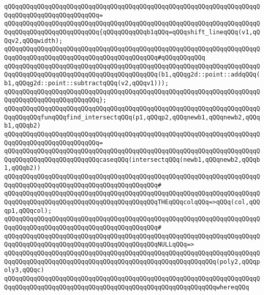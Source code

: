\verb|qQQqqQQqqQQqqQQqqQQqqQQqqQQqqQQqqQQqqQQqqQQqqQQqqQQqqQQqqQQqqQQqqQQqqQQqqQQqqQQqqQQqqQQqqQQqqQQq=|\newline
\verb|qQQqqQQqqQQqqQQqqQQqqQQqqQQqqQQqqQQqqQQqqQQqqQQqqQQqqQQqqQQqqQQqqQQqqQQqqQQqqQQqqQQqqQQqqQQqqQQq{qQQqqQQqqQQqb1qQQq=qQQqshift_lineqQQq(v1,qQQqv2,qQQqwidth);|\newline
\verb|qQQqqQQqqQQqqQQqqQQqqQQqqQQqqQQqqQQqqQQqqQQqqQQqqQQqqQQqqQQqqQQqqQQqqQQqqQQqqQQqqQQqqQQqqQQqqQQqqQQqqQQqqQQqqQQq#qQQqqQQqqQQq|\newline
\verb|qQQqqQQqqQQqqQQqqQQqqQQqqQQqqQQqqQQqqQQqqQQqqQQqqQQqqQQqqQQqqQQqqQQqqQQqqQQqqQQqqQQqqQQqqQQqqQQqqQQqqQQqqQQqqQQq(b1,qQQqg2d::point::addqQQq(b1,qQQqg2d::point::subtractqQQq(v2,qQQqv1)));|\newline
\verb|qQQqqQQqqQQqqQQqqQQqqQQqqQQqqQQqqQQqqQQqqQQqqQQqqQQqqQQqqQQqqQQqqQQqqQQqqQQqqQQqqQQqqQQqqQQqqQQq};|\newline
\newline
\verb|qQQqqQQqqQQqqQQqqQQqqQQqqQQqqQQqqQQqqQQqqQQqqQQqqQQqqQQqqQQqqQQqqQQqqQQqqQQqqQQqfunqQQqfind_intersectqQQq(p1,qQQqp2,qQQqnewb1,qQQqnewb2,qQQqb1,qQQqb2)|\newline
\verb|qQQqqQQqqQQqqQQqqQQqqQQqqQQqqQQqqQQqqQQqqQQqqQQqqQQqqQQqqQQqqQQqqQQqqQQqqQQqqQQqqQQqqQQqqQQqqQQq=|\newline
\verb|qQQqqQQqqQQqqQQqqQQqqQQqqQQqqQQqqQQqqQQqqQQqqQQqqQQqqQQqqQQqqQQqqQQqqQQqqQQqqQQqqQQqqQQqqQQqqQQqcaseqQQq(intersectqQQq(newb1,qQQqnewb2,qQQqb1,qQQqb2))|\newline
\verb|qQQqqQQqqQQqqQQqqQQqqQQqqQQqqQQqqQQqqQQqqQQqqQQqqQQqqQQqqQQqqQQqqQQqqQQqqQQqqQQqqQQqqQQqqQQqqQQqqQQqqQQqqQQqqQQq#|\newline
\verb|qQQqqQQqqQQqqQQqqQQqqQQqqQQqqQQqqQQqqQQqqQQqqQQqqQQqqQQqqQQqqQQqqQQqqQQqqQQqqQQqqQQqqQQqqQQqqQQqqQQqqQQqqQQqqQQqTHEqQQqcolqQQq=>qQQq(col,qQQqp1,qQQqcol);|\newline
\verb|qQQqqQQqqQQqqQQqqQQqqQQqqQQqqQQqqQQqqQQqqQQqqQQqqQQqqQQqqQQqqQQqqQQqqQQqqQQqqQQqqQQqqQQqqQQqqQQqqQQqqQQqqQQqqQQq#|\newline
\verb|qQQqqQQqqQQqqQQqqQQqqQQqqQQqqQQqqQQqqQQqqQQqqQQqqQQqqQQqqQQqqQQqqQQqqQQqqQQqqQQqqQQqqQQqqQQqqQQqqQQqqQQqqQQqqQQqNULLqQQq=>|\newline
\verb|qQQqqQQqqQQqqQQqqQQqqQQqqQQqqQQqqQQqqQQqqQQqqQQqqQQqqQQqqQQqqQQqqQQqqQQqqQQqqQQqqQQqqQQqqQQqqQQqqQQqqQQqqQQqqQQqqQQqqQQqqQQqqQQq(poly2,qQQqpoly3,qQQqc)|\newline
\verb|qQQqqQQqqQQqqQQqqQQqqQQqqQQqqQQqqQQqqQQqqQQqqQQqqQQqqQQqqQQqqQQqqQQqqQQqqQQqqQQqqQQqqQQqqQQqqQQqqQQqqQQqqQQqqQQqqQQqqQQqqQQqqQQqwhereqQQq|\newline
